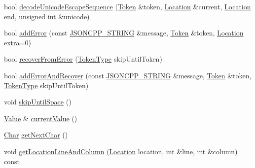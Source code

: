 \begin{DoxyCompactItemize}
\item 
bool \hyperlink{classJson_1_1OurReader_adb39be814cc6076b91a0919bdd5b24b0_adb39be814cc6076b91a0919bdd5b24b0}{decode\+Unicode\+Escape\+Sequence} (\hyperlink{classJson_1_1OurReader_1_1Token}{Token} \&token, \hyperlink{classJson_1_1OurReader_a1bdc7bbc52ba87cae6b19746f2ee0189_a1bdc7bbc52ba87cae6b19746f2ee0189}{Location} \&current, \hyperlink{classJson_1_1OurReader_a1bdc7bbc52ba87cae6b19746f2ee0189_a1bdc7bbc52ba87cae6b19746f2ee0189}{Location} end, unsigned int \&unicode)
\item 
bool \hyperlink{classJson_1_1OurReader_aa6a920311e6408ff3a45324d49da18a6_aa6a920311e6408ff3a45324d49da18a6}{add\+Error} (const \hyperlink{json_8h_a1e723f95759de062585bc4a8fd3fa4be_a1e723f95759de062585bc4a8fd3fa4be}{J\+S\+O\+N\+C\+P\+P\+\_\+\+S\+T\+R\+I\+NG} \&message, \hyperlink{classJson_1_1OurReader_1_1Token}{Token} \&token, \hyperlink{classJson_1_1OurReader_a1bdc7bbc52ba87cae6b19746f2ee0189_a1bdc7bbc52ba87cae6b19746f2ee0189}{Location} extra=0)
\item 
bool \hyperlink{classJson_1_1OurReader_a035651f0700a76a815e5f904c63ebb1c_a035651f0700a76a815e5f904c63ebb1c}{recover\+From\+Error} (\hyperlink{classJson_1_1OurReader_a15116f7276ddf1e7a2cc3cbefa884dcc_a15116f7276ddf1e7a2cc3cbefa884dcc}{Token\+Type} skip\+Until\+Token)
\item 
bool \hyperlink{classJson_1_1OurReader_a074cf3d91e9404fe89e03cfc6a43e6fb_a074cf3d91e9404fe89e03cfc6a43e6fb}{add\+Error\+And\+Recover} (const \hyperlink{json_8h_a1e723f95759de062585bc4a8fd3fa4be_a1e723f95759de062585bc4a8fd3fa4be}{J\+S\+O\+N\+C\+P\+P\+\_\+\+S\+T\+R\+I\+NG} \&message, \hyperlink{classJson_1_1OurReader_1_1Token}{Token} \&token, \hyperlink{classJson_1_1OurReader_a15116f7276ddf1e7a2cc3cbefa884dcc_a15116f7276ddf1e7a2cc3cbefa884dcc}{Token\+Type} skip\+Until\+Token)
\item 
void \hyperlink{classJson_1_1OurReader_ad48bdaf5b686706f003e792fdbcbf102_ad48bdaf5b686706f003e792fdbcbf102}{skip\+Until\+Space} ()
\item 
\hyperlink{classJson_1_1Value}{Value} \& \hyperlink{classJson_1_1OurReader_a2acd5b1d53e7d7e17c21ff8e96edc09d_a2acd5b1d53e7d7e17c21ff8e96edc09d}{current\+Value} ()
\item 
\hyperlink{classJson_1_1OurReader_a0cd0bab4caa66594ab843ccd5f9dc239_a0cd0bab4caa66594ab843ccd5f9dc239}{Char} \hyperlink{classJson_1_1OurReader_a298285d035fdbc554caae09d9f0a5859_a298285d035fdbc554caae09d9f0a5859}{get\+Next\+Char} ()
\item 
void \hyperlink{classJson_1_1OurReader_af482c8e718615646e13a996292e18d74_af482c8e718615646e13a996292e18d74}{get\+Location\+Line\+And\+Column} (\hyperlink{classJson_1_1OurReader_a1bdc7bbc52ba87cae6b19746f2ee0189_a1bdc7bbc52ba87cae6b19746f2ee0189}{Location} location, int \&line, int \&column) const

\end{DoxyCompactItemize}

